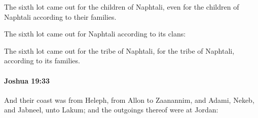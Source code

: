 			\begin{versebox}
					\item[BHS] 
					\item[ASV] The sixth lot came out for the children of Naphtali, even for the children of Naphtali according to their families.
					\item[NIV] The sixth lot came out for Naphtali according to its clans:
					\item[NRSV] The sixth lot came out for the tribe of Naphtali, for the tribe of Naphtali, according to its families.
			\end{versebox}

		\paragraph{Joshua 19:33} %
			\label{JOSHUA-19-33}

			And their coast was from Heleph, from Allon to Zaanannim, and Adami, Nekeb, and Jabneel, unto Lakum; and the outgoings thereof were at Jordan:

